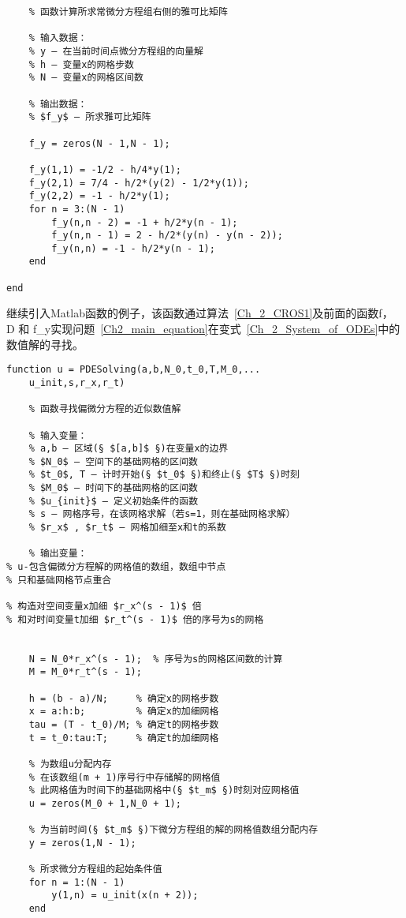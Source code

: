 \documentclass[twoside]{book}
\begin{document}
\begin{CJK*}{GBK}{song}
\begin{lstlisting}
    % 函数计算所求常微分方程组右侧的雅可比矩阵

    % 输入数据：
    % y – 在当前时间点微分方程组的向量解
    % h – 变量x的网格步数
    % N – 变量x的网格区间数

    % 输出数据：
    % $f_y$ – 所求雅可比矩阵

    f_y = zeros(N - 1,N - 1);

    f_y(1,1) = -1/2 - h/4*y(1);
    f_y(2,1) = 7/4 - h/2*(y(2) - 1/2*y(1));
    f_y(2,2) = -1 - h/2*y(1);
    for n = 3:(N - 1)
        f_y(n,n - 2) = -1 + h/2*y(n - 1);
        f_y(n,n - 1) = 2 - h/2*(y(n) - y(n - 2));
        f_y(n,n) = -1 - h/2*y(n - 1);
    end

end
\end{lstlisting}



继续引入Matlab函数的例子，该函数通过算法~\eqref{Ch_2_CROS1}及前面的函数f， D 和 f\_y实现问题~\eqref{Ch2_main_equation}在变式~\eqref{Ch_2_System_of_ODEs}中的数值解的寻找。
%
\begin{lstlisting}
function u = PDESolving(a,b,N_0,t_0,T,M_0,...
    u_init,s,r_x,r_t)

    % 函数寻找偏微分方程的近似数值解

    % 输入变量：
    % a,b – 区域(§ $[a,b]$ §)在变量x的边界
    % $N_0$ – 空间下的基础网格的区间数
    % $t_0$, T – 计时开始(§ $t_0$ §)和终止(§ $T$ §)时刻
    % $M_0$ – 时间下的基础网格的区间数
    % $u_{init}$ – 定义初始条件的函数
    % s – 网格序号，在该网格求解（若s=1，则在基础网格求解）
    % $r_x$ , $r_t$ – 网格加细至x和t的系数

    % 输出变量：
% u-包含偏微分方程解的网格值的数组，数组中节点
% 只和基础网格节点重合

% 构造对空间变量x加细 $r_x^(s - 1)$ 倍
% 和对时间变量t加细 $r_t^(s - 1)$ 倍的序号为s的网格


    N = N_0*r_x^(s - 1);  % 序号为s的网格区间数的计算
    M = M_0*r_t^(s - 1);

    h = (b - a)/N;     % 确定x的网格步数
    x = a:h:b;         % 确定x的加细网格
    tau = (T - t_0)/M; % 确定t的网格步数
    t = t_0:tau:T;     % 确定t的加细网格

    % 为数组u分配内存
    % 在该数组(m + 1)序号行中存储解的网格值
    % 此网格值为时间下的基础网格中(§ $t_m$ §)时刻对应网格值
    u = zeros(M_0 + 1,N_0 + 1);

    % 为当前时间(§ $t_m$ §)下微分方程组的解的网格值数组分配内存
    y = zeros(1,N - 1);

    % 所求微分方程组的起始条件值
    for n = 1:(N - 1)
        y(1,n) = u_init(x(n + 2));
    end


\end{lstlisting}
\end{CJK*}
\end{document}
